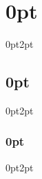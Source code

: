\geometry{margin=0.7in}
\usepackage{titlesec}
\titlespacing\section{0pt}{0pt}{2pt}
\titlespacing\subsection{0pt}{0pt}{2pt}
\titlespacing\subsubsection{0pt}{0pt}{2pt}